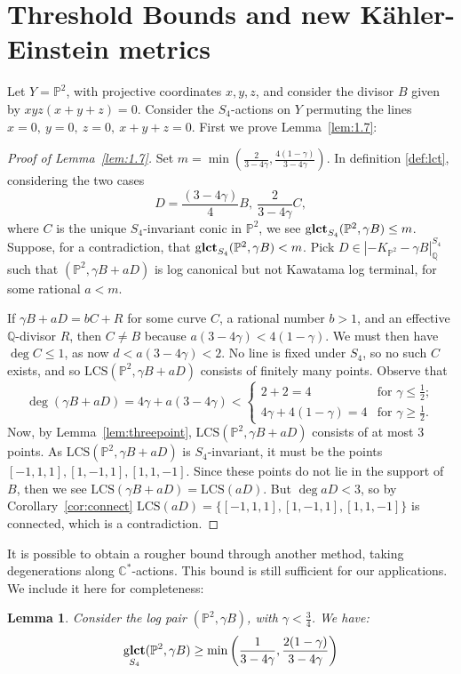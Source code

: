 \documentclass{amsart}
\newtheorem{lemma}[theorem]{Lemma}
\theoremstyle{definition}
\newcommand{\CC}{\mathbb{C}}
\newcommand{\QQ}{\mathbb{Q}}
\newcommand{\PP}{\mathbb{P}}
\newcommand{\LCS}{\text{LCS}}
\DeclareMathOperator{\glct}{g\bf{lct}}
\begin{document}
\section{Threshold Bounds and new K\"ahler-Einstein metrics}
Let \(Y = \PP^2\), with projective coordinates \(x,y,z\), and consider the divisor \(B\) given by \(xyz(x+y+z) = 0\). Consider the \(S_4\)-actions on \(Y\) permuting the lines \(x=0, \ y=0, \ z=0, \ x+y+z=0\). First we prove Lemma~\ref{lem:1.7}:
\begin{proof}[Proof of Lemma~\ref{lem:1.7}]
Set \(m = \min \left( \frac{2}{3-4 \gamma},\frac{4(1-\gamma)}{3-4\gamma} \right)\). In definition \ref{def:lct}, considering the two cases  \[
D = \frac{(3-4 \gamma)}{4}B, \ \frac{2}{3-4 \gamma} C,
\]
where \(C\) is the unique \(S_4\)-invariant conic in \(\PP^2\), we see \(\glct_{S_4}(\PP^2, \gamma B) \le m \). Suppose, for a contradiction, that \(\glct_{S_4}(\PP^2, \gamma B) < m\). Pick \(D \in |-K_{\PP^2} - \gamma B|^{S_4}_\QQ \) such that \((\PP^2, \gamma B + a D)\) is log canonical but not Kawatama log terminal, for some rational \(a<m\).

If \(\gamma B + aD = bC +R \) for some curve \(C\), a rational number \(b>1\), and an effective \(\QQ\)-divisor \(R\), then \(C \neq B \) because \(a(3-4 \gamma) < 4(1-\gamma)\). We must then have \(\deg C \le 1\), as now \(d < a(3-4\gamma) <2\). No line is fixed under \(S_4\), so no such \(C\) exists, and so \(\LCS(\PP^2, \gamma B + aD)\) consists of finitely many points. Observe that
\[
\deg (\gamma B + aD) = 4\gamma + a(3-4 \gamma) <  \begin{cases}
2 + 2 = 4 & \text{for }  \gamma \le \frac{1}{2};\\
4 \gamma + 4(1-\gamma) =4 & \text{for }  \gamma \ge \frac{1}{2}.
\end{cases}
\]
Now, by Lemma~\ref{lem:threepoint}, \(\LCS(\PP^2,\gamma B + aD)\) consists of at most \(3\) points. As \(\LCS(\PP^2,\gamma B + aD)\) is \(S_4\)-invariant, it must be the points \([-1,1,1],[1,-1,1],[1,1,-1]\). Since these points do not lie in the support of \(B\), then we see \(\LCS(\gamma B+aD) = \LCS(aD) \). But \(\deg aD <3\), so by Corollary~\ref{cor:connect} \(\LCS(aD) = \{[-1,1,1],[1,-1,1],[1,1,-1]\}\) is connected, which is a contradiction.
\end{proof}
It is possible to obtain a rougher bound through another method, taking degenerations along \(\CC^*\)-actions. This bound is still sufficient for our applications. We include it here for completeness:
\begin{lemma}
Consider the log pair \((\PP^2,\gamma B)\), with \(\gamma < \frac{3}{4}\). We have:
\[
\glct_{S_4}(\PP^2, \gamma B) \ge
\min \left(\frac{1}{3-4 \gamma}, \frac{2(1-\gamma)}{3-4\gamma}\right)
\]
\end{lemma}
\end{document}
